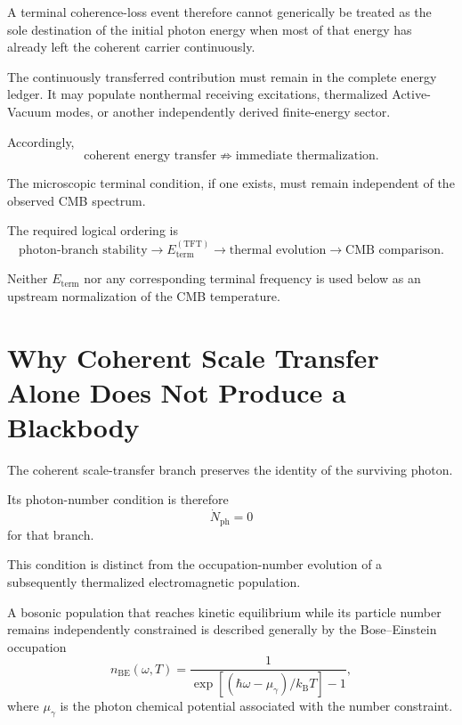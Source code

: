 A terminal coherence-loss event therefore cannot generically be treated as
the sole destination of the initial photon energy when most of that energy
has already left the coherent carrier continuously.

The continuously transferred contribution must remain in the complete energy
ledger. It may populate nonthermal receiving excitations, thermalized
Active-Vacuum modes, or another independently derived finite-energy sector.

Accordingly,
\begin{equation}
    \text{coherent energy transfer}
    \not\Rightarrow
    \text{immediate thermalization}.
    \label{eq:AT_transfer_not_thermalization}
\end{equation}

The microscopic terminal condition, if one exists, must remain independent
of the observed CMB spectrum.

The required logical ordering is
\begin{equation}
    \text{photon-branch stability}
    \longrightarrow
    E_{\mathrm{term}}^{(\mathrm{TFT})}
    \longrightarrow
    \text{thermal evolution}
    \longrightarrow
    \text{CMB comparison}.
    \label{eq:AT_terminal_logic}
\end{equation}

Neither
\(E_{\mathrm{term}}\)
nor any corresponding terminal frequency is used below as an upstream
normalization of the CMB temperature.


\section{Why Coherent Scale Transfer Alone Does Not Produce a Blackbody}

The coherent scale-transfer branch preserves the identity of the surviving
photon.

Its photon-number condition is therefore
\begin{equation}
    \dot N_{\mathrm{ph}}
    =
    0
    \label{eq:AT_coherent_number}
\end{equation}
for that branch.

This condition is distinct from the occupation-number evolution of a
subsequently thermalized electromagnetic population.

A bosonic population that reaches kinetic equilibrium while its particle
number remains independently constrained is described generally by the
Bose--Einstein occupation
\begin{equation}
    n_{\mathrm{BE}}(\omega,T)
    =
    \frac{1}{
        \exp
        \left[
            \left(
                \hbar\omega-\mu_\gamma
            \right)
            /
            k_{\mathrm B}T
        \right]
        -1
    },
    \label{eq:AT_BE_mu}
\end{equation}
where
\(\mu_\gamma\)
is the photon chemical potential associated with the number constraint.

